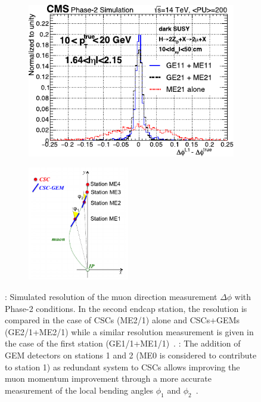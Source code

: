 	\begin{figure}[H]
		\begin{subfigure}{0.5\linewidth}
			\centering
			\includegraphics[width=.9\linewidth]{fig/chapt4/GEM-muon-direction.pdf}
			\caption{\label{fig:GEM-Muon:A}}
		\end{subfigure}
		\begin{subfigure}{0.5\linewidth}
			\centering
			\includegraphics[height=5cm]{fig/chapt4/GEM-muon-bending.png}
			\caption{\label{fig:GEM-Muon:B}}
		\end{subfigure}
		\caption{\label{fig:GEM-Muon} : Simulated resolution of the muon direction measurement $\Delta\phi$ with Phase-2 conditions. In the second endcap station, the resolution is compared in the case of CSCs (ME2/1) alone and CSCs+GEMs (GE2/1+ME2/1) while a similar resolution measurement is given in the case of the first station (GE1/1+ME1/1)~\cite{PHASEIITP}. : The addition of GEM detectors on stations 1 and 2 (ME0 is considered to contribute to station 1) as redundant system to CSCs allows improving the muon momentum improvement through a more accurate measurement of the local bending angles $\phi_1$ and $\phi_2$~\cite{PHASEIITP}.}
	\end{figure}
	
